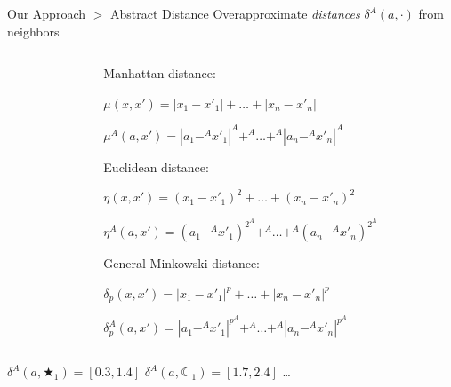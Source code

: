 \documentclass[11pt]{beamer}
\begin{document}
\begin{frame}{Our Approach $>$ Abstract Distance}
Overapproximate \emph{distances} $\delta^A(a, \cdot)$ from neighbors
\begin{columns}
 \begin{column}{0.35\textwidth}
  \begin{center}
   
  \end{center}
 \end{column}
 \begin{column}{0.65\textwidth}
  Manhattan distance:
  
  $\mu(x, x') = |x_1 - x'_1| + \ldots + |x_n - x'_n|$
  
  $\mu^A(a, x') = |a_1 -^A x'_1|^A +^A \ldots +^A |a_n -^A x'_n|^A$

  \vspace{1em}
  Euclidean distance:
  
  $\eta(x, x') = (x_1 - x'_1)^2 + \ldots + (x_n - x'_n)^2$
  
  $\eta^A(a, x') = (a_1 -^A x'_1)^{2^A} +^A \ldots +^A (a_n -^A x'_n)^{2^A}$
  
  \vspace{1em}
  General Minkowski distance:
  
  $\delta_p(x, x') = |x_1 - x'_1|^p + \ldots + |x_n - x'_n|^p$
  
  $\delta^A_p(a, x') = |a_1 -^A x'_1|^{p^A} +^A \ldots +^A |a_n -^A x'_n|^{p^A}$
 \end{column}
\end{columns}

\begin{center}
$\delta^A(a, \bigstar_1) = [0.3, 1.4]$
\hspace{1em}
$\delta^A(a, \leftmoon_1) = [1.7, 2.4]$
\hspace{1em}
\ldots
\end{center}
\end{frame}
\end{document}
